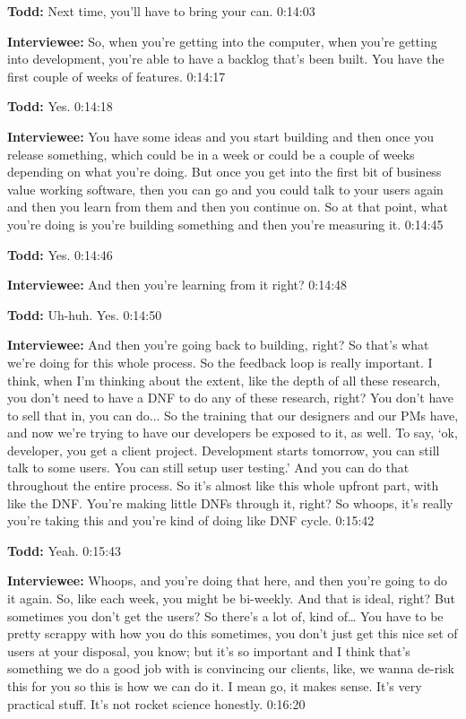 \textbf{Todd:} Next time, you'll have to bring your can.  0:14:03

\textbf{Interviewee:} So, when you're getting into the computer, when you're getting into development, you're able to have a backlog that's been built.  You have the first couple of weeks of features.   0:14:17

\textbf{Todd:} Yes.  0:14:18

\textbf{Interviewee:} You have some ideas and you start building and then once you release something, which could be in a week or could be a couple of weeks depending on what you're doing.  But once you get into the first bit of business value working software, then you can go and you could talk to your users again and then you learn from them and then you continue on.  So at that point, what you're doing is you're building something and then you're measuring it.    0:14:45

\textbf{Todd:} Yes.   0:14:46

\textbf{Interviewee:} And then you're learning from it right?   0:14:48

\textbf{Todd:} Uh-huh. Yes.  0:14:50

\textbf{Interviewee:} And then you're going back to building, right? So that's what we're doing for this whole process. So the feedback loop is really important.  I think, when I'm thinking about the extent, like the depth of all these research, you don't need to have a DNF to do any of these research, right?  You don't have to sell that in, you can do...  So the training that our designers and our PMs have, and now we're trying to have our developers be exposed to it, as well.  To say, ‘ok, developer, you get a client project. Development starts tomorrow, you can still talk to some users.  You can still setup user testing.'  And you can do that throughout the entire process.  So it's almost like this whole upfront part, with like the DNF.  You're making little DNFs through it, right?  So whoops, it's really you're taking this and you're kind of doing like DNF cycle.   0:15:42

\textbf{Todd:} Yeah.   0:15:43

\textbf{Interviewee:} Whoops, and you're doing that here, and then you're going to do it again. So, like each week, you might be bi-weekly.   And that is ideal, right?  But sometimes you don't get the users?  So there's a lot of, kind of…  You have to be pretty scrappy with how you do this sometimes, you don't just get this nice set of users at your disposal, you know; but it's so important and I think that's something we do a good job with is convincing our clients, like, we wanna de-risk this for you so this is how we can do it.  I mean go, it makes sense.  It's very practical stuff.  It's not rocket science honestly.   0:16:20
